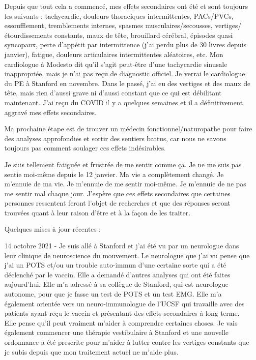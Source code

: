 Depuis que tout cela a commencé, mes effets secondaires ont été et sont toujours
les suivants : tachycardie, douleurs thoraciques intermittentes, PACs/PVCs,
essoufflement, tremblements internes, spasmes musculaires/secousses,
vertiges/étourdissements constants, maux de tête, brouillard cérébral, épisodes
quasi syncopaux, perte d'appétit par intermittence (j'ai perdu plus de 30 livres
depuis janvier), fatigue, douleurs articulaires intermittentes aléatoires,
etc. Mon cardiologue à Modesto dit qu'il s'agit peut-être d'une tachycardie
sinusale inappropriée, mais je n'ai pas reçu de diagnostic officiel. Je verrai
le cardiologue du PE à Stanford en novembre. Dans le passé, j'ai eu des vertiges
et des maux de tête, mais rien d'aussi grave ni d'aussi constant que ce qui est
débilitant maintenant. J'ai reçu du COVID il y a quelques semaines et il a
définitivement aggravé mes effets secondaires.

Ma prochaine étape est de trouver un médecin fonctionnel/naturopathe pour faire
des analyses approfondies et sortir des sentiers battus, car nous ne savons
toujours pas comment soulager ces effets indésirables.

Je suis tellement fatiguée et frustrée de me sentir comme ça. Je ne me suis pas
sentie moi-même depuis le 12 janvier. Ma vie a complètement changé. Je m'ennuie
de ma vie. Je m'ennuie de me sentir moi-même. Je m'ennuie de ne pas me sentir
mal chaque jour. J'espère que ces effets secondaires que certaines personnes
ressentent feront l'objet de recherches et que des réponses seront trouvées
quant à leur raison d'être et à la façon de les traiter.

Quelques mises à jour récentes :

14 octobre 2021 - Je suis allé à Stanford et j'ai été vu par un neurologue dans
leur clinique de neuroscience du mouvement. Le neurologue que j'ai vu pense que
j'ai un POTS et/ou un trouble auto-immun d'une certaine sorte qui a été
déclenché par le vaccin. Elle a demandé d'autres analyses qui ont été faites
aujourd'hui. Elle m'a adressé à sa collègue de Stanford, qui est neurologue
autonome, pour que je fasse un test de POTS et un test EMG. Elle m'a également
orientée vers un neuro-immunologue de l'UCSF qui travaille avec des patients
ayant reçu le vaccin et présentant des effets secondaires à long terme. Elle
pense qu'il peut vraiment m'aider à comprendre certaines choses. Je vais
également commencer une thérapie vestibulaire à Stanford et une nouvelle
ordonnance a été prescrite pour m'aider à lutter contre les vertiges constants
que je subis depuis que mon traitement actuel ne m'aide plus.

